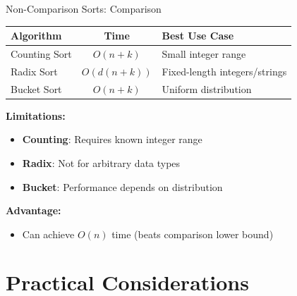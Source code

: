 \documentclass[aspectratio=169]{beamer}
\begin{document}
\begin{frame}{Non-Comparison Sorts: Comparison}
  \begin{center}
  \begin{tabular}{|l|c|p{4cm}|}
    \hline
    \textbf{Algorithm} & \textbf{Time} & \textbf{Best Use Case} \\
    \hline
    Counting Sort & $O(n + k)$ & Small integer range \\
    \hline
    Radix Sort & $O(d(n + k))$ & Fixed-length integers/strings \\
    \hline
    Bucket Sort & $O(n + k)$ & Uniform distribution \\
    \hline
  \end{tabular}
  \end{center}

  \vspace{0.3cm}
  \textbf{Limitations:}
  \begin{itemize}
    \item \textbf{Counting}: Requires known integer range
    \item \textbf{Radix}: Not for arbitrary data types
    \item \textbf{Bucket}: Performance depends on distribution
  \end{itemize}

  \vspace{0.3cm}
  \textbf{Advantage:}
  \begin{itemize}
    \item Can achieve $O(n)$ time (beats comparison lower bound)
  \end{itemize}
\end{frame}

\section{Practical Considerations}
\end{document}
